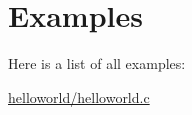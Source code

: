 \section{Examples}
Here is a list of all examples\+:\begin{DoxyCompactItemize}
\item 
\hyperlink{a00063}{helloworld/helloworld.\+c}
\end{DoxyCompactItemize}
